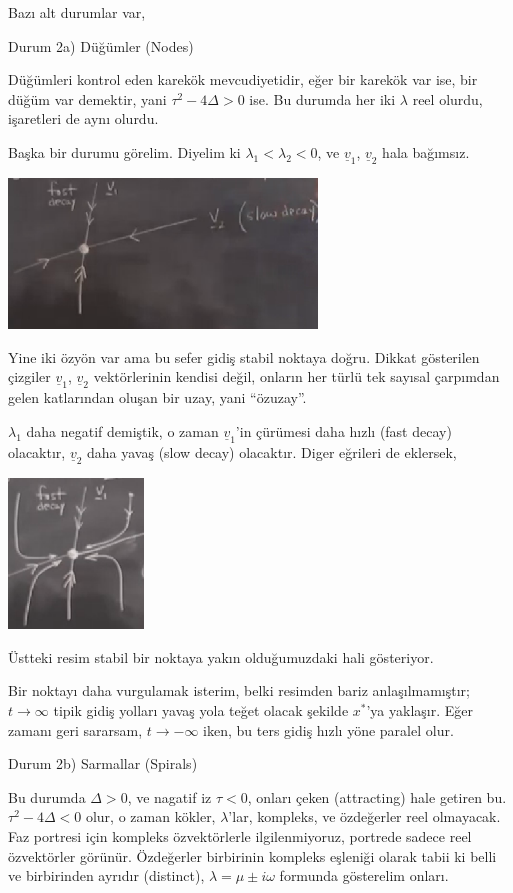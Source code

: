 \documentclass[12pt,fleqn]{article}\usepackage{../../common}
\begin{document}
Bazı alt durumlar var,

Durum 2a) Düğümler (Nodes)

Düğümleri kontrol eden karekök mevcudiyetidir, eğer bir karekök var ise, bir
düğüm var demektir, yani $\tau^2 - 4\Delta > 0$ ise. Bu durumda her iki
$\lambda$ reel olurdu, işaretleri de aynı olurdu.

Başka bir durumu görelim. Diyelim ki $\lambda_1 < \lambda_2 < 0$, ve
$\underline{v}_1$, $\underline{v}_2$ hala bağımsız.

\includegraphics[height=4cm]{05_11.png}

Yine iki özyön var ama bu sefer gidiş stabil noktaya doğru. Dikkat gösterilen
çizgiler $\underline{v}_1$, $\underline{v}_2$ vektörlerinin kendisi değil, onların
her türlü tek sayısal çarpımdan gelen katlarından oluşan bir uzay, yani
``özuzay''.

$\lambda_1$ daha negatif demiştik, o zaman $\underline{v}_1$'in çürümesi daha
hızlı (fast decay) olacaktır, $\underline{v}_2$ daha yavaş (slow decay)
olacaktır. Diger eğrileri de eklersek,

\includegraphics[height=4cm]{05_12.png}

Üstteki resim stabil bir noktaya yakın olduğumuzdaki hali gösteriyor.

Bir noktayı daha vurgulamak isterim, belki resimden bariz anlaşılmamıştır;
$t\to\infty$ tipik gidiş yolları yavaş yola teğet olacak şekilde $x^\ast$'ya
yaklaşır. Eğer zamanı geri sararsam, $t\to-\infty$ iken, bu ters gidiş hızlı
yöne paralel olur.

Durum 2b) Sarmallar (Spirals)

Bu durumda $\Delta > 0$, ve nagatif iz $\tau < 0$, onları çeken (attracting)
hale getiren bu. $\tau^2 - 4\Delta < 0$ olur, o zaman kökler, $\lambda$'lar,
kompleks, ve özdeğerler reel olmayacak. Faz portresi için kompleks özvektörlerle
ilgilenmiyoruz, portrede sadece reel özvektörler görünür. Özdeğerler birbirinin
kompleks eşleniği olarak tabii ki belli ve birbirinden ayrıdır (distinct),
$\lambda = \mu \pm i\omega$ formunda gösterelim onları.
\end{document}
